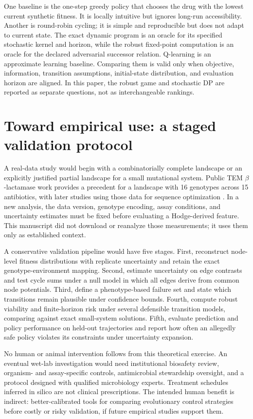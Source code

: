 \documentclass[11pt]{article}
\theoremstyle{definition}\newtheorem{definition}[proposition]{Definition}\theoremstyle{remark}\newtheorem{remark}[proposition]{Remark}
\begin{document}
One baseline is the one-step greedy policy that chooses the drug with the lowest current synthetic fitness. It is locally intuitive but ignores long-run accessibility. Another is round-robin cycling; it is simple and reproducible but does not adapt to current state. The exact dynamic program is an oracle for its specified stochastic kernel and horizon, while the robust fixed-point computation is an oracle for the declared adversarial successor relation. Q-learning is an approximate learning baseline. Comparing them is valid only when objective, information, transition assumptions, initial-state distribution, and evaluation horizon are aligned. In this paper, the robust game and stochastic DP are reported as separate questions, not as interchangeable rankings.

\section{Toward empirical use: a staged validation protocol}
A real-data study would begin with a combinatorially complete landscape or an explicitly justified partial landscape for a small mutational system. Public TEM $\beta$-lactamase work provides a precedent for a landscape with 16 genotypes across 15 antibiotics, with later studies using those data for sequence optimization \citep{Mira2015,Nichol2015,Weaver2024}. In a new analysis, the data version, genotype encoding, assay conditions, and uncertainty estimates must be fixed before evaluating a Hodge-derived feature. This manuscript did not download or reanalyze those measurements; it uses them only as established context.

A conservative validation pipeline would have five stages. First, reconstruct node-level fitness distributions with replicate uncertainty and retain the exact genotype-environment mapping. Second, estimate uncertainty on edge contrasts and test cycle sums under a null model in which all edges derive from common node potentials. Third, define a phenotype-based failure set and state which transitions remain plausible under confidence bounds. Fourth, compute robust viability and finite-horizon risk under several defensible transition models, comparing against exact small-system solutions. Fifth, evaluate prediction and policy performance on held-out trajectories and report how often an allegedly safe policy violates its constraints under uncertainty expansion.

No human or animal intervention follows from this theoretical exercise. An eventual wet-lab investigation would need institutional biosafety review, organism- and assay-specific controls, antimicrobial stewardship oversight, and a protocol designed with qualified microbiology experts. Treatment schedules inferred in silico are not clinical prescriptions. The intended human benefit is indirect: better-calibrated tools for comparing evolutionary control strategies before costly or risky validation, if future empirical studies support them.
\end{document}
